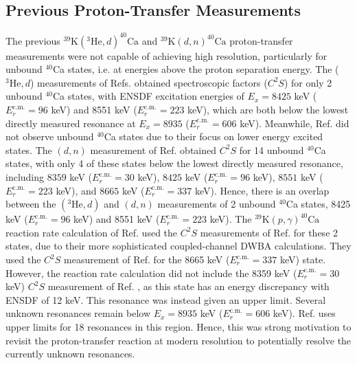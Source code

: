 \subsection{Previous Proton-Transfer Measurements}

The previous $^{39}\mathrm{K}(^{3}\mathrm{He},d)^{40}\mathrm{Ca}$ \cite{Erskine1966,Seth1967,Forster1970,Cage1971} and $^{39}\mathrm{K}(d,n)^{40}\mathrm{Ca}$ \cite{Fuchs1969} proton-transfer measurements were not capable of achieving high resolution, particularly for unbound $^{40}$Ca states, i.e. at energies above the proton separation energy. The ($^{3}\mathrm{He},d$) measurements of Refs. \cite{Erskine1966,Seth1967,Cage1971} obtained spectroscopic factors ($C^{2}S$) for only 2 unbound $^{40}$Ca states, with ENSDF \cite{Chen2017} excitation energies of $E_{x} = 8425$ keV ($E^{\mathrm{c.m.}}_{r} = 96$ keV) and 8551 keV ($E^{\mathrm{c.m.}}_{r} = 223$ keV), which are both below the lowest directly measured resonance at $E_{x} = 8935$ ($E^{\mathrm{c.m.}}_{r} = 606$ keV). Meanwhile, Ref. \cite{Forster1970} did not observe unbound $^{40}$Ca states due to their focus on lower energy excited states. The $(d,n)$ measurement of Ref. \cite{Fuchs1969} obtained $C^{2}S$ for 14 unbound $^{40}$Ca states, with only 4 of these states below the lowest directly measured resonance, including $8359$ keV ($E^{\mathrm{c.m.}}_{r} = 30$ keV), $8425$ keV ($E^{\mathrm{c.m.}}_{r} = 96$ keV), $8551$ keV ($E^{\mathrm{c.m.}}_{r} = 223$ keV), and $8665$ keV ($E^{\mathrm{c.m.}}_{r} = 337$ keV). Hence, there is an overlap between the $(^{3}\mathrm{He},d)$ and $(d,n)$ measurements of 2 unbound $^{40}$Ca states, 8425 keV ($E^{\mathrm{c.m.}}_{r} = 96$ keV) and 8551 keV ($E^{\mathrm{c.m.}}_{r} = 223$ keV). The $^{39}\mathrm{K}(p,\gamma)^{40}\mathrm{Ca}$ reaction rate calculation of Ref. \cite{Longland2018} used the $C^{2}S$ measurements of Ref. \cite{Cage1971} for these 2 states, due to their more sophisticated coupled-channel DWBA calculations. They used the $C^{2}S$ measurement of Ref. \cite{Fuchs1969} for the 8665 keV ($E^{\mathrm{c.m.}}_{r} = 337$ keV) state. However, the reaction rate calculation did not include the 8359 keV ($E^{\mathrm{c.m.}}_{r} = 30$ keV) $C^{2}S$ measurement of Ref. \cite{Fuchs1969}, as this state has an energy discrepancy with ENSDF \cite{Chen2017} of 12 keV. This resonance was instead given an upper limit. Several unknown resonances remain below $E_{x} = 8935$ keV ($E^{\mathrm{c.m.}}_{r} = 606$ keV). Ref. \cite{Longland2018} uses upper limits for 18 resonances in this region. Hence, this was strong motivation to revisit the proton-transfer reaction at modern resolution to potentially resolve the currently unknown resonances.

